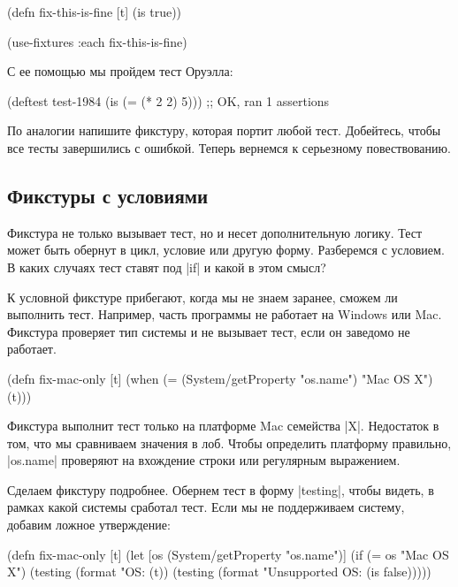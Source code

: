 \begin{english}
  \begin{clojure}
(defn fix-this-is-fine [t]
  (is true))

(use-fixtures :each fix-this-is-fine)
  \end{clojure}
\end{english}

С ее помощью мы пройдем тест Оруэлла:

\begin{english}
  \begin{clojure}
(deftest test-1984
  (is (= (* 2 2) 5)))
;; OK, ran 1 assertions
  \end{clojure}
\end{english}

По аналогии напишите фикстуру, которая портит любой тест. Добейтесь, чтобы все
тесты завершились с ошибкой. Теперь вернемся к серьезному повествованию.

\subsection{Фикстуры с условиями}

Фикстура не только вызывает тест, но и несет дополнительную логику. Тест может
быть обернут в цикл, условие или другую форму. Разберемся с условием. В каких
случаях тест ставят под \spverb|if| и какой в этом смысл?

К условной фикстуре прибегают, когда мы не знаем заранее, сможем ли выполнить
тест. Например, часть программы не работает на Windows или Mac. Фикстура
проверяет тип системы и не вызывает тест, если он заведомо не работает.

\begin{english}
  \begin{clojure}
(defn fix-mac-only [t]
  (when (= (System/getProperty "os.name") "Mac OS X")
    (t)))
  \end{clojure}
\end{english}

Фикстура выполнит тест только на платформе Mac семейства \spverb|X|. Недостаток
в том, что мы сравниваем значения в лоб. Чтобы определить платформу правильно,
\spverb|os.name| проверяют на вхождение строки или регулярным выражением.

Сделаем фикстуру подробнее. Обернем тест в форму \spverb|testing|, чтобы видеть,
в рамках какой системы сработал тест. Если мы не поддерживаем систему, добавим
ложное утверждение:

\begin{english}
  \begin{clojure}
(defn fix-mac-only [t]
  (let [os (System/getProperty "os.name")]
    (if (= os "Mac OS X")
      (testing (format "OS: %
        (t))
      (testing (format "Unsupported OS: %
        (is false)))))
  \end{clojure}
\end{english}

